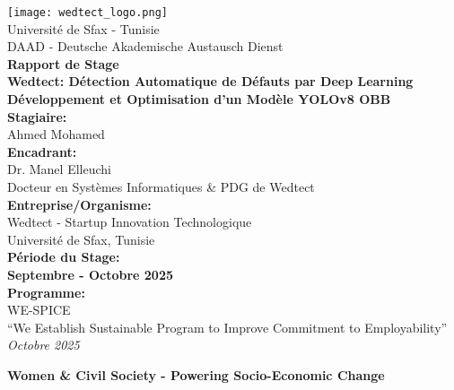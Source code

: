 \documentclass[a4paper,12pt]{report}
\begin{document}
\begin{titlepage}
    \centering
    
    \vspace*{-1cm}
    \texttt{[image: wedtect\_logo.png]}\\[0.5cm]
    
    {\small Université de Sfax - Tunisie}\\
    {\small DAAD - Deutsche Akademische Austausch Dienst}\\[2cm]
    
    {\Huge \textbf{Rapport de Stage}}\\[1.5cm]
    
    {\LARGE \textbf{Wedtect: Détection Automatique de Défauts par Deep Learning}}\\[0.5cm]
    {\LARGE \textbf{Développement et Optimisation d'un Modèle YOLOv8 OBB}}\\[2cm]
    
    {\Large \textbf{Stagiaire:}} \\
    {\large Ahmed Mohamed}\\[1cm]
    
    {\Large \textbf{Encadrant:}} \\
    {\large Dr. Manel Elleuchi}\\
    {\large Docteur en Systèmes Informatiques \& PDG de Wedtect}\\[1cm]
    
    {\Large \textbf{Entreprise/Organisme:}} \\
    {\large Wedtect - Startup Innovation Technologique}\\
    {\large Université de Sfax, Tunisie}\\[1cm]
    
    {\Large \textbf{Période du Stage:}} \\
    {\large \textbf{Septembre - Octobre 2025}}\\[1cm]
    
    {\Large \textbf{Programme:}} \\
    {\large WE-SPICE}\\
    {\large ``We Establish Sustainable Program to Improve Commitment to Employability''}\\[2cm]
    
    {\large \textit{Octobre 2025}}
    
    \vfill
    
    {\small \textbf{Women \& Civil Society - Powering Socio-Economic Change}}
    
\end{titlepage}
\end{document}
